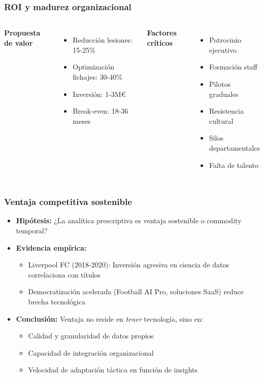 \documentclass[aspectratio=169]{beamer}
\begin{document}
\begin{frame}\frametitle{ROI y madurez organizacional}
\begin{columns}[T]
\textbf{Propuesta de valor}
\begin{itemize}
    \item Reducción lesiones: 15-25\%
    \item Optimización fichajes: 30-40\%
    \item Inversión: 1-3M\euro
    \item Break-even: 18-36 meses
\end{itemize}

\textbf{Factores críticos}
\begin{itemize}
    \item[\checkmark] Patrocinio ejecutivo
    \item[\checkmark] Formación staff
    \item[\checkmark] Pilotos graduales
    \item[$\times$] Resistencia cultural
    \item[$\times$] Silos departamentales
    \item[$\times$] Falta de talento
\end{itemize}
\end{columns}
\end{frame}

\begin{frame}\frametitle{Ventaja competitiva sostenible}
\begin{itemize}
    \item \textbf{Hipótesis:} ¿La analítica prescriptiva es ventaja sostenible o commodity temporal?
    \item \textbf{Evidencia empírica:}
    \begin{itemize}
        \item Liverpool FC (2018-2020): Inversión agresiva en ciencia de datos correlaciona con títulos
        \item Democratización acelerada (Football AI Pro, soluciones SaaS) reduce brecha tecnológica
    \end{itemize}
    \item \textbf{Conclusión:} Ventaja no reside en \textit{tener} tecnología, sino en:
    \begin{itemize}
        \item Calidad y granularidad de datos propios
        \item Capacidad de integración organizacional
        \item Velocidad de adaptación táctica en función de insights
    \end{itemize}
\end{itemize}
\end{frame}
\end{document}
